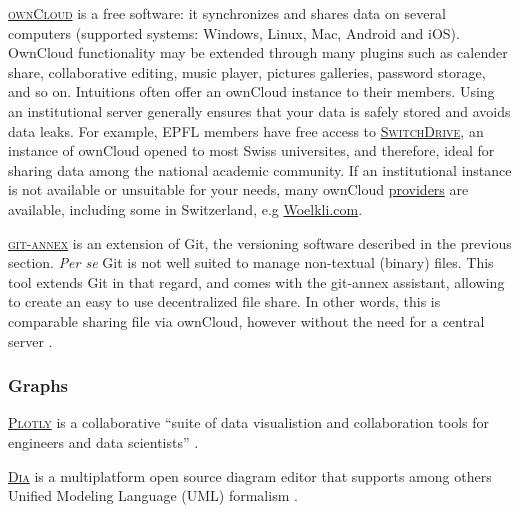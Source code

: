 \vspace{0.4cm}

\noindent \label{ownCloud}  \textsc{\href{http://owncloud.org}{ownCloud}} is a free software: it synchronizes and shares data on several computers (supported systems: Windows, Linux, Mac, Android and iOS). OwnCloud functionality may be extended through many plugins such as calender share, collaborative editing, music player, pictures galleries, password storage, and so on. Intuitions often offer an ownCloud instance to their members. Using an institutional server generally ensures that your data is safely stored and avoids data leaks. For example, EPFL members have free access to \textsc{\href{http://drive.switch.ch}{SwitchDrive}}, an instance of ownCloud opened to most Swiss universites, and therefore, ideal for sharing data among the national academic community\cite{owncloud_owncloud.org_2015,switchdrive_switchdrive_2015}. If an institutional instance is not available or unsuitable for your  needs, many ownCloud \href{https://owncloud.org/providers/}{providers} are available\cite{owncloud.org_owncloud_2015}, including some in Switzerland, e.g \href{https://woelkli.com}{Woelkli.com}\cite{woelkli_secure_2015}.   

\vspace{0.4cm}

\noindent {}  \textsc{\href{http://git-annex.branchable.com/}{git-annex}} is an extension of Git, the versioning software described in the previous section. \textit{Per se} Git is not well suited to manage non-textual (binary) files. This tool extends Git in that regard, and comes with the git-annex assistant, allowing to create an easy to use decentralized file share. In other words, this is comparable sharing file via ownCloud, however without the need for a central server \cite{git-annex_git-annex_2015}.

\subsubsection{Graphs}

\noindent {} \textsc{\href{https://plot.ly}{Plotly}} is a collaborative ``suite of data visualistion and collaboration tools for engineers and data scientists'' \cite{plot.ly_plotly_2015}.

\vspace{0.4cm}

\noindent {} \textsc{\href{https://wiki.gnome.org/Apps/Dia/}{Dia}} is a multiplatform open source diagram editor that supports among others Unified Modeling Language (UML) formalism \cite{gnu_dia_2015}.

